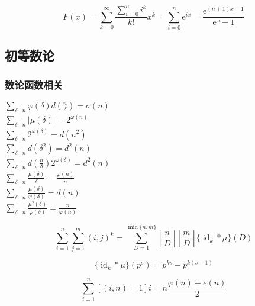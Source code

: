 \begin{equation}
    F(x) = \sum_{k=0}^\infty \frac{\sum_{i=0}^n i^k}{k!}x^k = \sum_{i=0}^n \mathrm{e}^{ix} = \frac{\mathrm{e}^{(n+1)x-1}}{\mathrm{e}^x-1}
\end{equation}

\subsection{初等数论}

\subsubsection{数论函数相关}

\begin{multicols}{3}
    \(\displaystyle \sum_{\delta\mid n}\varphi(\delta)d\left(\frac{n}{\delta}\right) = \sigma(n)\) \\
    \(\displaystyle \sum_{\delta\mid n}\left|\mu(\delta)\right| = 2^{\omega(n)}\) \\
    \(\displaystyle \sum_{\delta\mid n}2^{\omega(\delta)} = d(n^2)\) \\
    \(\displaystyle \sum_{\delta\mid n}d(\delta^2) = d^2(n)\) \\
    \(\displaystyle \sum_{\delta\mid n}d\left(\frac{n}{\delta}\right)2^{\omega(\delta)} = d^2(n)\) \\
    \(\displaystyle \sum_{\delta\mid n}\frac{\mu(\delta)}{\delta} = \frac{\varphi(n)}{n}\) \\
    \(\displaystyle \sum_{\delta\mid n}\frac{\mu(\delta)}{\varphi(\delta)} = d(n)\) \\
    \(\displaystyle \sum_{\delta\mid n}\frac{\mu^2(\delta)}{\varphi(\delta)} = \frac{n}{\varphi(n)}\)
\end{multicols}

\begin{equation}
    \sum_{i=1}^n\sum_{j=1}^m(i,j)^k=\sum_{D=1}^{\min\{n,m\}}\left\lfloor\frac{n}{D}\right\rfloor\left\lfloor\frac{m}{D}\right\rfloor\{\operatorname{id}_k*\mu\}(D)
\end{equation}

\begin{equation}
    \{\operatorname{id}_k*\mu\}(p^s)=p^{ks}-p^{k(s-1)}
\end{equation}

\begin{equation}
    \sum_{i = 1} ^ n \left[(i, n) = 1\right] i = n \frac {\varphi(n) + e(n)} 2
\end{equation}

